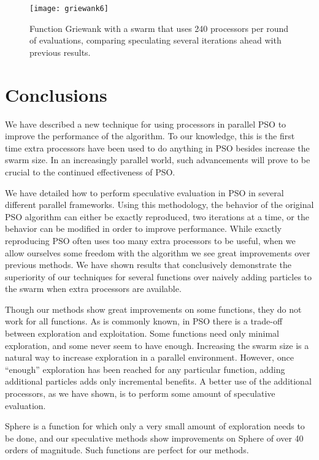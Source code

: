 \documentclass[journal,letterpaper]{IEEEtran}
\begin{document}
\begin{figure}
  \centering
  \texttt{[image: griewank6]}
  \caption{Function Griewank with a swarm that uses 240 processors per round of
  evaluations, comparing speculating several iterations ahead with previous
  results.}
  \label{fig:griewank-manyiters}
\end{figure}

\section{Conclusions}
\label{sec:conclusion}

We have described a new technique for using processors in parallel PSO to
improve the performance of the algorithm.  To our knowledge, this is the first
time extra processors have been used to do anything in PSO besides increase the
swarm size.  In an increasingly parallel world, such advancements will prove to
be crucial to the continued effectiveness of PSO.

We have detailed how to perform speculative evaluation in PSO in several
different parallel frameworks.  Using this methodology, the behavior of the
original PSO algorithm can either be exactly reproduced, two iterations at a
time, or the behavior can be modified in order to improve performance.  While
exactly reproducing PSO often uses too many extra processors to be useful, when
we allow ourselves some freedom with the algorithm we see great improvements
over previous methods.  We have shown results that conclusively demonstrate the
superiority of our techniques for several functions over naively adding
particles to the swarm when extra processors are available.

Though our methods show great improvements on some functions, they do not work
for all functions.  As is commonly known, in PSO there is a trade-off between
exploration and exploitation.  Some functions need only minimal exploration,
and some never seem to have enough.  Increasing the swarm size is a natural way
to increase exploration in a parallel environment.  However, once ``enough''
exploration has been reached for any particular function, adding additional
particles adds only incremental benefits.  A better use of the additional
processors, as we have shown, is to perform some amount of speculative
evaluation.

Sphere is a function for which only a very small amount of exploration needs to
be done, and our speculative methods show improvements on Sphere of over 40
orders of magnitude.  Such functions are perfect for our methods.
\end{document}
